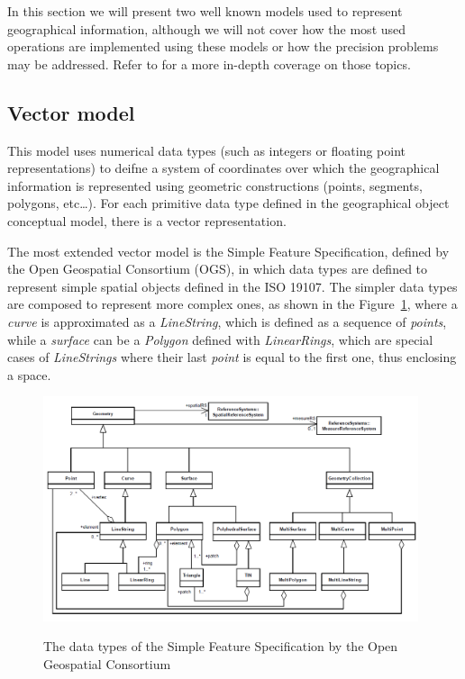     In this section we will present two well known models used to represent geographical information, although we will not cover how the most used operations are implemented using these models or how the precision problems may be addressed. Refer to \cite{xiao2015gis} for a more in-depth coverage on those topics.
    
    \subsection{Vector model}
    This model uses numerical data types (such as integers or floating point representations) to deifne a system of coordinates over which the geographical information is represented using geometric constructions (points, segments, polygons, etc\dots). For each primitive data type defined in the geographical object conceptual model, there is a vector representation.
    
    The most extended vector model is the Simple Feature Specification, defined by the Open Geospatial Consortium (OGS), in which data types are defined to represent simple spatial objects defined in the ISO 19107. The simpler data types are composed to represent more complex ones, as shown in the Figure~\ref{fig:gis:sfc}, where a \textit{curve} is approximated as a \textit{LineString}, which is defined as a sequence of \textit{points}, while a \textit{surface} can be a \textit{Polygon} defined with \textit{LinearRings}, which are special cases of \textit{LineStrings} where their last \textit{point} is equal to the first one, thus enclosing a space.
    
    \begin{figure}[ht]
		\begin{center}
			{\includegraphics[width=0.98\textwidth]{figures/sfc.png}}
		\end{center}
		\caption{The data types of the Simple Feature Specification by the Open Geospatial Consortium}
		\label{fig:gis:sfc}
	\end{figure}
	
